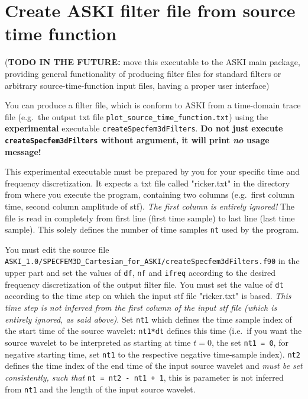 \documentclass[12pt,a4paper]{article}
\newcommand{\lcode}[1]{\nolinkurl{#1}}
\newcommand{\ASKI}{ {\ttfamily ASKI} }
\begin{document}
\section{Create \ASKI filter file from source time function} \label{createSpecfem3dFilters}
%
({\bf TODO IN THE FUTURE:} move this executable to the \ASKI main package, providing general functionality of 
producing filter files for standard filters or arbitrary source-time-function input files, having a proper
user interface)

You can produce a filter file, which is conform to \ASKI from a time-domain trace file (e.g.\ the output
txt file \lcode{plot_source_time_function.txt}) using the {\bf experimental} executable \lcode{createSpecfem3dFilters}.
{\bf Do not just execute \lcode{createSpecfem3dFilters} without argument, it will print \emph{no} usage message!}

This experimental executable must be prepared by you for your specific time and frequency discretization.
It expects a txt file called "ricker.txt" in the directory from where you execute the program, containing
two columns (e.g.\ first column time, second column amplitude of stf). \emph{The first column is entirely ignored!}
The file is read in completely from first line (first time sample) to last line (last time sample). This solely
defines the number of time samples \lcode{nt} used by the program.

You must edit the source file\\
\lcode{ASKI_1.0/SPECFEM3D_Cartesian_for_ASKI/createSpecfem3dFilters.f90} in the upper part and set
the values of \lcode{df}, \lcode{nf} and \lcode{ifreq} according to the desired frequency discretization of the
output filter file.
You must set the value of \lcode{dt} according to the time step on which the input stf file "ricker.txt" 
is based. \emph{This time step is not inferred from the first column of the input stf file (which is 
entirely ignored, as said above)}. Set \lcode{nt1} which defines the time sample index of the start 
time of the source wavelet: \lcode{nt1*dt} defines this time (i.e.\ if you want the source wavelet to be interpreted as starting at
time $t=0$, the set \lcode{nt1 = 0}, for negative starting time, set \lcode{nt1} to the respective negative 
time-sample index). \lcode{nt2} defines the time index of the end time of the input source wavelet and 
\emph{must be set consistently, such that} \lcode{nt = nt2 - nt1 + 1}, this is parameter is not inferred from
\lcode{nt1} and the length of the input source wavelet. 
\end{document}
